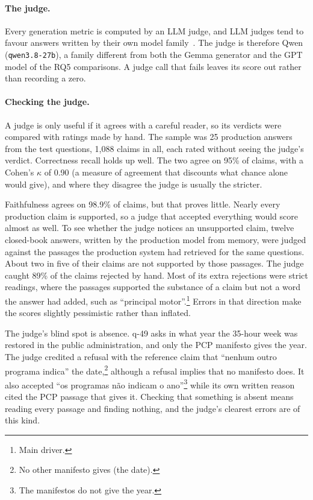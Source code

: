 \paragraph{The judge.} Every generation metric is computed by an LLM judge,
and LLM judges tend to favour answers written by their own model
family~\citep{zheng2023judging}. The judge is therefore Qwen
(\texttt{qwen3.8-27b}), a family different from both the Gemma generator and
the GPT model of the RQ5 comparisons. A judge call that fails leaves its score
out rather than recording a zero.

\paragraph{Checking the judge.} A judge is only useful if it agrees with a
careful reader, so its verdicts were compared with ratings made by hand. The
sample was 25 production answers from the test questions, 1,088 claims in
all, each rated without seeing the judge's verdict. Correctness recall holds
up well. The two agree on 95\% of claims, with a Cohen's $\kappa$ of 0.90 (a
measure of agreement that discounts what chance alone would give), and where
they disagree the judge is usually the stricter.

Faithfulness agrees on 98.9\% of claims, but that proves little. Nearly every
production claim is supported, so a judge that accepted everything would score
almost as well. To see whether the judge notices an unsupported claim, twelve
closed-book answers, written by the production model from memory, were judged
against the passages the production system had retrieved for the same
questions. About two in five of their claims are not supported by those
passages. The judge caught 89\% of the claims rejected by hand. Most of its
extra rejections were strict readings, where the passages supported the
substance of a claim but not a word the answer had added, such as ``principal
motor''.\footnote{Main driver.} Errors in that direction make the scores
slightly pessimistic rather than inflated.

The judge's blind spot is absence. q-49 asks in what year the 35-hour week was
restored in the public administration, and only the PCP manifesto gives the
year. The judge credited a refusal with the reference claim that ``nenhum
outro programa indica'' the date,\footnote{No other manifesto gives (the
date).} although a refusal implies that no manifesto does. It also accepted
``os programas não indicam o ano''\footnote{The manifestos do not give the
year.} while its own written reason cited the PCP passage that gives it.
Checking that something is absent means reading every passage and finding
nothing, and the judge's clearest errors are of this kind.

